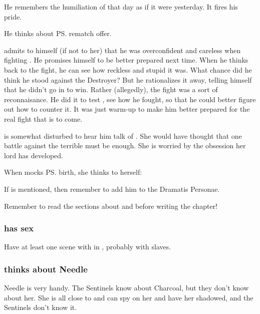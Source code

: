 \begin{garbage}
He remembers the humiliation of that day as if it were yesterday. 
It fires his pride. 

He thinks about {\ps{\Ishnaruchaefir} rematch offer}. 

\Teshrial{} admits to himself (if not to her) that he was overconfident and careless when fighting \Ishnaruchaefir{}. 
He promises himself to be better prepared next time. 
When he thinks back to the fight, he can see how reckless and stupid it was. 
What chance did he think he stood against the Destroyer? 
But he rationalizes it away, telling himself that he didn't go in to win. 
Rather (allegedly), the fight was a sort of reconnaisance. 
He did it to test \Ishnaruchaefir, see how he fought, so that he could better figure out how to counter it. 
It was just warm-up to make him better prepared for the real fight that is to come. 

\Achsah{} is somewhat disturbed to hear him talk of . 
She would have thought that one battle against the terrible \Ishnaruchaefir{} must be enough. 
She is worried by the obsession her lord has developed. 

When \Teshrial{} mocks \ps{\Achsah} birth, she thinks to herself: 
  
If \Thanatzil{} is mentioned, then remember to add him to the Dramatis Personae. 

Remember to read the sections about \hs{\Teshrial} and \hs{\Achsah} before writing the chapter!





\subsubsection{\Achsah{} has sex}
Have at least one scene with  in \Nyx, probably with \human{} slaves. 





\subsubsection{\Achsah{} thinks about Needle}
Needle is very handy. 
The Sentinels know about Charcoal, but they don't know about her. 
She is all close to \Tiroco{} and can spy on her and have her shadowed, and the Sentinels don't know it. 


\end{garbage}
